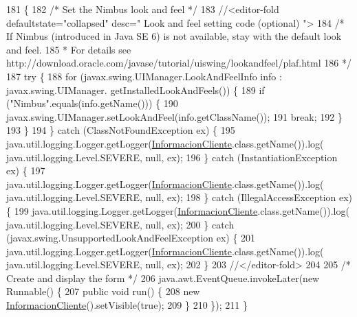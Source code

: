 \begin{DoxyCode}
181                                            \{
182         \textcolor{comment}{/* Set the Nimbus look and feel */}
183         \textcolor{comment}{//<editor-fold defaultstate="collapsed" desc=" Look and feel setting code (optional) ">}
184         \textcolor{comment}{/* If Nimbus (introduced in Java SE 6) is not available, stay with the default look and feel.}
185 \textcolor{comment}{         * For details see http://download.oracle.com/javase/tutorial/uiswing/lookandfeel/plaf.html }
186 \textcolor{comment}{         */}
187         \textcolor{keywordflow}{try} \{
188             \textcolor{keywordflow}{for} (javax.swing.UIManager.LookAndFeelInfo info : javax.swing.UIManager.
      getInstalledLookAndFeels()) \{
189                 \textcolor{keywordflow}{if} (\textcolor{stringliteral}{"Nimbus"}.equals(info.getName())) \{
190                     javax.swing.UIManager.setLookAndFeel(info.getClassName());
191                     \textcolor{keywordflow}{break};
192                 \}
193             \}
194         \} \textcolor{keywordflow}{catch} (ClassNotFoundException ex) \{
195             java.util.logging.Logger.getLogger(\mbox{\hyperlink{class_interfaz_package_1_1_informacion_cliente_aad6339ab89c410c65ca97dc545479efb}{InformacionCliente}}.class.getName()).log(
      java.util.logging.Level.SEVERE, null, ex);
196         \} \textcolor{keywordflow}{catch} (InstantiationException ex) \{
197             java.util.logging.Logger.getLogger(\mbox{\hyperlink{class_interfaz_package_1_1_informacion_cliente_aad6339ab89c410c65ca97dc545479efb}{InformacionCliente}}.class.getName()).log(
      java.util.logging.Level.SEVERE, null, ex);
198         \} \textcolor{keywordflow}{catch} (IllegalAccessException ex) \{
199             java.util.logging.Logger.getLogger(\mbox{\hyperlink{class_interfaz_package_1_1_informacion_cliente_aad6339ab89c410c65ca97dc545479efb}{InformacionCliente}}.class.getName()).log(
      java.util.logging.Level.SEVERE, null, ex);
200         \} \textcolor{keywordflow}{catch} (javax.swing.UnsupportedLookAndFeelException ex) \{
201             java.util.logging.Logger.getLogger(\mbox{\hyperlink{class_interfaz_package_1_1_informacion_cliente_aad6339ab89c410c65ca97dc545479efb}{InformacionCliente}}.class.getName()).log(
      java.util.logging.Level.SEVERE, null, ex);
202         \}
203         \textcolor{comment}{//</editor-fold>}
204 
205         \textcolor{comment}{/* Create and display the form */}
206         java.awt.EventQueue.invokeLater(\textcolor{keyword}{new} Runnable() \{
207             \textcolor{keyword}{public} \textcolor{keywordtype}{void} run() \{
208                 \textcolor{keyword}{new} \mbox{\hyperlink{class_interfaz_package_1_1_informacion_cliente_aad6339ab89c410c65ca97dc545479efb}{InformacionCliente}}().setVisible(\textcolor{keyword}{true});
209             \}
210         \});
211     \}
\end{DoxyCode}


